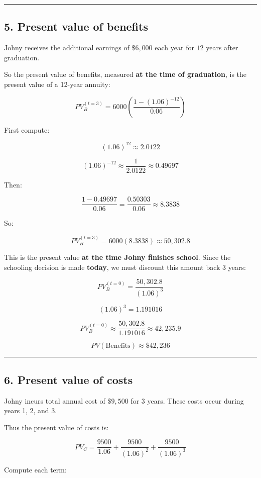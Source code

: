 \documentclass[12pt]{article}
\begin{document}
\hrule
\vspace{0.5em}

\subsection*{5. Present value of benefits}

Johny receives the additional earnings of \(\$6{,}000\) each year for \(12\) years after graduation.

So the present value of benefits, measured \textbf{at the time of graduation}, is the present value of a 12-year annuity:

\[
PV_B^{(t=3)} = 6000 \left( \frac{1-(1.06)^{-12}}{0.06} \right)
\]

First compute:

\[
(1.06)^{12} \approx 2.0122
\]

\[
(1.06)^{-12} \approx \frac{1}{2.0122} \approx 0.49697
\]

Then:

\[
\frac{1-0.49697}{0.06} = \frac{0.50303}{0.06} \approx 8.3838
\]

So:

\[
PV_B^{(t=3)} = 6000(8.3838) \approx 50{,}302.8
\]

This is the present value \textbf{at the time Johny finishes school}. Since the schooling decision is made \textbf{today}, we must discount this amount back 3 years:

\[
PV_B^{(t=0)} = \frac{50{,}302.8}{(1.06)^3}
\]

\[
(1.06)^3 = 1.191016
\]

\[
PV_B^{(t=0)} \approx \frac{50{,}302.8}{1.191016} \approx 42{,}235.9
\]

\[
\boxed{PV(\text{Benefits}) \approx \$42{,}236}
\]

\hrule
\vspace{0.5em}

\subsection*{6. Present value of costs}

Johny incurs total annual cost of \(\$9{,}500\) for 3 years. These costs occur during years 1, 2, and 3.

Thus the present value of costs is:

\[
PV_C = \frac{9500}{1.06} + \frac{9500}{(1.06)^2} + \frac{9500}{(1.06)^3}
\]

Compute each term:
\end{document}
